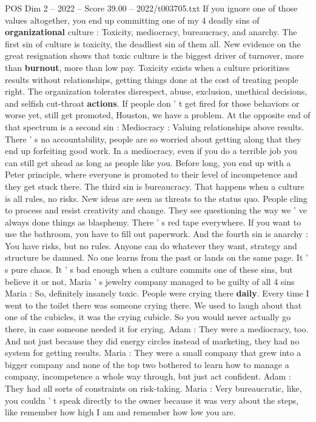 \begin{textsample}{POS Dim 2 – 2022 – Score 39.00 – 2022/t003705.txt}
If you ignore one of those values altogether, you end up committing one of my 4 deadly sins of \textbf{organizational} culture : Toxicity, mediocracy, bureaucracy, and anarchy.
The first sin of culture is toxicity, the deadliest sin of them all.
New evidence on the great resignation shows that toxic culture is the biggest driver of turnover, more than \textbf{burnout}, more than low pay.
Toxicity exists when a culture prioritizes results without relationships, getting things done at the cost of treating people right.
The organization tolerates disrespect, abuse, exclusion, unethical decisions, and selfish cut-throat \textbf{actions}.
If people don ' t get fired for those behaviors or worse yet, still get promoted, Houston, we have a problem.
At the opposite end of that spectrum is a second sin : Mediocracy : Valuing relationships above results.
There ' s no accountability, people are so worried about getting along that they end up forfeiting good work.
In a mediocracy, even if you do a terrible job you can still get ahead as long as people like you.
Before long, you end up with a Peter principle, where everyone is promoted to their level of incompetence and they get stuck there.
The third sin is bureaucracy.
That happens when a culture is all rules, no risks.
New ideas are seen as threats to the status quo.
People cling to process and resist creativity and change.
They see questioning the way we ' ve always done things as blasphemy.
There ' s red tape everywhere.
If you want to use the bathroom, you have to fill out paperwork.
And the fourth sin is anarchy : You have risks, but no rules.
Anyone can do whatever they want, strategy and structure be damned.
No one learns from the past or lands on the same page.
It ' s pure chaos.
It ' s bad enough when a culture commits one of these sins, but believe it or not, Maria ' s jewelry company managed to be guilty of all 4 sins Maria : So, definitely insanely toxic.
People were crying there \textbf{daily}.
Every time I went to the toilet there was someone crying there.
We used to laugh about that one of the cubicles, it was the crying cubicle.
So you would never actually go there, in case someone needed it for crying.
Adam : They were a mediocracy, too.
And not just because they did energy circles instead of marketing, they had no system for getting results.
Maria : They were a small company that grew into a bigger company and none of the top two bothered to learn how to manage a company, incompetence a whole way through, but just act confident.
Adam : They had all sorts of constraints on risk-taking.
Maria : Very bureaucratic, like, you couldn ' t speak directly to the owner because it was very about the steps, like remember how high I am and remember how low you are.

\end{textsample}

